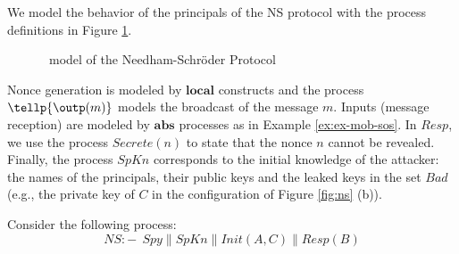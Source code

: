 \documentclass{tlp}
\begin{document}
We model the behavior of the principals of the NS protocol with the process definitions in Figure \ref{ns:utcc:procs}. 
\begin{figure}
\caption{\utcc\ model of the Needham-Schr\"oder Protocol \label{ns:utcc:procs}}
\end{figure}
Nonce generation is modeled by $\mathbf{local}$ constructs and the process $\tellp{\outp(m)}$ models the broadcast of the  message $m$. Inputs (message reception) are modeled by 
 $\mathbf{abs}$ processes as in Example \ref{ex:ex-mob-sos}. In ${Resp}$, we use the process ${Secrete}(n)$ to state that the nonce  $n$ cannot be revealed. Finally, the process ${SpKn}$ corresponds to the initial knowledge of the attacker:   the names of the principals, their public keys and the 
 leaked keys in the set $Bad$ (e.g., the private key of $C$ in the configuration of Figure \ref{fig:ns} (b)).









Consider the following process:
\begin{equation}\label{eq:ns-proc}
{NS} :-\ \   {Spy} \parallel {SpKn} \parallel {Init}(A,C) \parallel {Resp}(B)
\end{equation}
\end{document}
